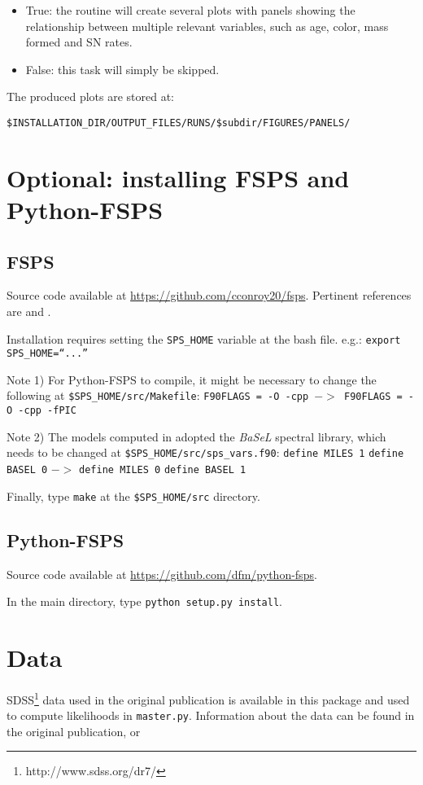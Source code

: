 \documentclass[manuscript]{aastex}
\begin{document}
\begin{itemize}
\item True: the routine will create several plots with panels showing the relationship between multiple relevant variables, such as age, color, mass formed and SN rates.
\item False: this task will simply be skipped.
\end{itemize}

The produced plots are stored at: 

\texttt{\$INSTALLATION\_DIR/OUTPUT\_FILES/RUNS/\$subdir/FIGURES/PANELS/}

\section{Optional: installing FSPS and Python-FSPS}
\label{sec:optional}

\subsection{FSPS}
\label{subsec:fsps}

Source code available at \href{https://github.com/cconroy20/fsps}{https://github.com/cconroy20/fsps}. Pertinent references are \citet{Conroy2009_fspsI} and \citet{Conroy2010_fspsII}.
      
Installation requires setting the \texttt{SPS\_HOME} variable at the
bash file. e.g.: \texttt{export SPS\_HOME=``...''}

Note 1) For Python-FSPS to compile, it might be necessary to change the following at \texttt{\$SPS\_HOME/src/Makefile}:
\texttt{F90FLAGS = -O -cpp $->$ F90FLAGS = -O -cpp -fPIC}

Note 2) The models computed in \citet{Heringer2017_DTD} adopted the \textit{BaSeL} spectral library, which needs to be changed at \texttt{\$SPS\_HOME/src/sps\_vars.f90}:
\texttt{define MILES 1}
\texttt{define BASEL 0}
$->$
\texttt{define MILES 0}
\texttt{define BASEL 1}

Finally, type \texttt{make} at the \texttt{\$SPS\_HOME/src} directory.

\subsection{Python-FSPS}
\label{subsec:Python-fsps}

Source code available at \href{https://github.com/dfm/python-fsps}{https://github.com/dfm/python-fsps}.

In the main directory, type \texttt{python setup.py install}.

\section{Data}
\label{sec:data}
SDSS\footnote{http://www.sdss.org/dr7/} data used in the original publication \citep{Heringer2017_DTD} is
available in this package and used to compute likelihoods in \texttt{master.py}. Information about the data can be found in the original publication, \citet{Frieman2008_SNsurvey} or \citet{Sako2014_SNsurvey}



\end{document}
